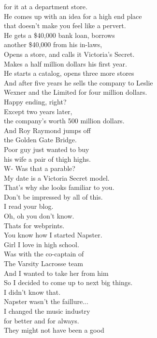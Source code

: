 \documentclass{article}
\begin{document}
\begin{multicols}{3}
for it at a department store.\\
He comes up with an idea for a high end place\\
that doesn't make you feel like a pervert.\\
He gets a \$40,000 bank loan, borrows\\
another \$40,000 from his in-laws,\\
Opens a store, and calls it Victoria's Secret.\\
Makes a half million dollars his first year.\\
He starts a catalog, opens three more stores\\
And after five years he sells the company to Leslie\\
Wexner and the Limited for four million dollars.\\
Happy ending, right?\\
Except two years later,\\
the company's worth 500 million dollars.\\
And Roy Raymond jumps off\\
the Golden Gate Bridge.\\
Poor guy just wanted to buy\\
his wife a pair of thigh highs.\\
W- Was that a parable?\\
My date is a Victoria Secret model.\\
That's why she looks familiar to you.\\
Don't be impressed by all of this.\\
I read your blog.\\
Oh, oh you don't know.\\
Thats for webprints.\\
You know how I started Napster.\\
Girl I love in high school.\\
Was with the co-captain of\\
The Varsity Lacrosse team\\
And I wanted to take her from him\\
So I decided to come up to next big things.\\
I didn't know that.\\
Napster wasn't the faillure...\\
I changed the music industry\\
for better and for always.\\
They might not have been a good\\

\end{multicols}
\end{document}
